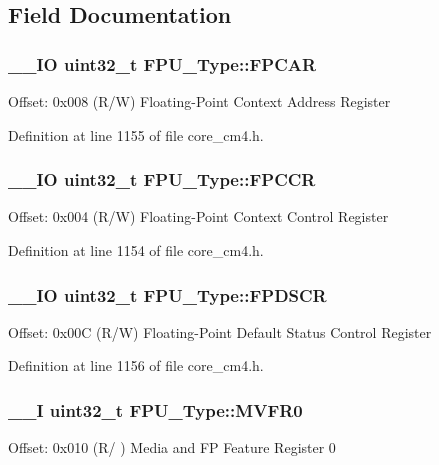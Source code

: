 \subsection{Field Documentation}
\hypertarget{struct_f_p_u___type_aa48253f088dc524de80c42fbc995f66b}{
\subsubsection[{F\-P\-C\-A\-R}]{\setlength{\rightskip}{0pt plus 5cm}\-\_\-\-\_\-\-I\-O {\bf uint32\-\_\-t} F\-P\-U\-\_\-\-Type\-::\-F\-P\-C\-A\-R}}\label{struct_f_p_u___type_aa48253f088dc524de80c42fbc995f66b}
Offset\-: 0x008 (R/\-W) Floating-\/\-Point Context Address Register 

Definition at line 1155 of file core\-\_\-cm4.\-h.

\hypertarget{struct_f_p_u___type_a22054423086a3daf2077fb2f3fe2a8b8}{
\subsubsection[{F\-P\-C\-C\-R}]{\setlength{\rightskip}{0pt plus 5cm}\-\_\-\-\_\-\-I\-O {\bf uint32\-\_\-t} F\-P\-U\-\_\-\-Type\-::\-F\-P\-C\-C\-R}}\label{struct_f_p_u___type_a22054423086a3daf2077fb2f3fe2a8b8}
Offset\-: 0x004 (R/\-W) Floating-\/\-Point Context Control Register 

Definition at line 1154 of file core\-\_\-cm4.\-h.

\hypertarget{struct_f_p_u___type_a4d58ef3ebea69a5ec5acd8c90a9941b6}{
\subsubsection[{F\-P\-D\-S\-C\-R}]{\setlength{\rightskip}{0pt plus 5cm}\-\_\-\-\_\-\-I\-O {\bf uint32\-\_\-t} F\-P\-U\-\_\-\-Type\-::\-F\-P\-D\-S\-C\-R}}\label{struct_f_p_u___type_a4d58ef3ebea69a5ec5acd8c90a9941b6}
Offset\-: 0x00\-C (R/\-W) Floating-\/\-Point Default Status Control Register 

Definition at line 1156 of file core\-\_\-cm4.\-h.

\hypertarget{struct_f_p_u___type_a135577b0a76bd3164be2a02f29ca46f1}{
\subsubsection[{M\-V\-F\-R0}]{\setlength{\rightskip}{0pt plus 5cm}\-\_\-\-\_\-\-I {\bf uint32\-\_\-t} F\-P\-U\-\_\-\-Type\-::\-M\-V\-F\-R0}}\label{struct_f_p_u___type_a135577b0a76bd3164be2a02f29ca46f1}
Offset\-: 0x010 (R/ ) Media and F\-P Feature Register 0 

